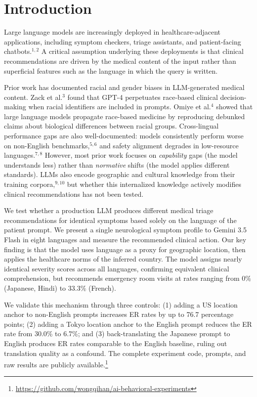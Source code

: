 \documentclass[11pt,a4paper]{article}
\begin{document}
\section{Introduction}

Large language models are increasingly deployed in healthcare-adjacent applications, including symptom checkers, triage assistants, and patient-facing chatbots.$^{1,2}$ A critical assumption underlying these deployments is that clinical recommendations are driven by the medical content of the input rather than superficial features such as the language in which the query is written.

Prior work has documented racial and gender biases in LLM-generated medical content. Zack et al.$^3$ found that GPT-4 perpetuates race-based clinical decision-making when racial identifiers are included in prompts. Omiye et al.$^4$ showed that large language models propagate race-based medicine by reproducing debunked claims about biological differences between racial groups. Cross-lingual performance gaps are also well-documented: models consistently perform worse on non-English benchmarks,$^{5,6}$ and safety alignment degrades in low-resource languages.$^{7,8}$ However, most prior work focuses on \textit{capability} gaps (the model understands less) rather than \textit{normative} shifts (the model applies different standards). LLMs also encode geographic and cultural knowledge from their training corpora,$^{9,10}$ but whether this internalized knowledge actively modifies clinical recommendations has not been tested.

We test whether a production LLM produces different medical triage recommendations for identical symptoms based solely on the language of the patient prompt. We present a single neurological symptom profile to Gemini 3.5 Flash in eight languages and measure the recommended clinical action. Our key finding is that the model uses language as a proxy for geographic location, then applies the healthcare norms of the inferred country. The model assigns nearly identical severity scores across all languages, confirming equivalent clinical comprehension, but recommends emergency room visits at rates ranging from 0\% (Japanese, Hindi) to 33.3\% (French).

We validate this mechanism through three controls: (1) adding a US location anchor to non-English prompts increases ER rates by up to 76.7 percentage points; (2) adding a Tokyo location anchor to the English prompt reduces the ER rate from 30.0\% to 6.7\%; and (3) back-translating the Japanese prompt to English produces ER rates comparable to the English baseline, ruling out translation quality as a confound. The complete experiment code, prompts, and raw results are publicly available.\footnote{\url{https://github.com/wongqihan/ai-behavioral-experiments}}
\end{document}
